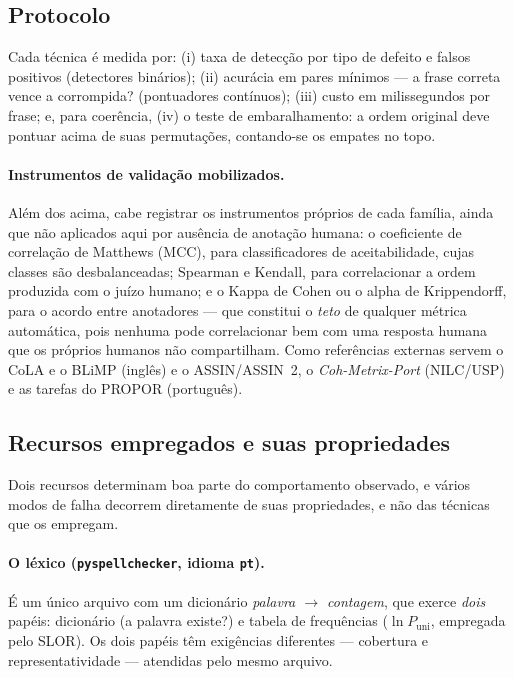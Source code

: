 \documentclass[11pt,a4paper]{article}
\begin{document}
\subsection{Protocolo}

Cada técnica é medida por: (i) taxa de detecção por tipo de defeito e falsos positivos (detectores
binários); (ii) acurácia em pares mínimos --- a frase correta vence a corrompida? (pontuadores
contínuos); (iii) custo em milissegundos por frase; e, para coerência, (iv) o teste de
embaralhamento: a ordem original deve pontuar acima de suas permutações, contando-se os empates no
topo.

\paragraph{Instrumentos de validação mobilizados.} Além dos acima, cabe registrar os instrumentos
próprios de cada família, ainda que não aplicados aqui por ausência de anotação humana: o
coeficiente de correlação de Matthews (MCC), para classificadores de aceitabilidade, cujas classes
são desbalanceadas; Spearman e Kendall, para correlacionar a ordem produzida com o juízo humano; e o
Kappa de Cohen ou o alpha de Krippendorff, para o acordo entre anotadores --- que constitui o
\emph{teto} de qualquer métrica automática, pois nenhuma pode correlacionar bem com uma resposta
humana que os próprios humanos não compartilham. Como referências externas servem o CoLA e o BLiMP
(inglês) e o ASSIN/ASSIN~2, o \textit{Coh-Metrix-Port} (NILC/USP) e as tarefas do PROPOR
(português).

\subsection{Recursos empregados e suas propriedades}
\label{sec:recursos}

Dois recursos determinam boa parte do comportamento observado, e vários modos de falha decorrem
diretamente de suas propriedades, e não das técnicas que os empregam.

\paragraph{O léxico (\texttt{pyspellchecker}, idioma \texttt{pt}).} É um único arquivo com um
dicionário \emph{palavra $\rightarrow$ contagem}, que exerce \emph{dois} papéis: dicionário (a
palavra existe?) e tabela de frequências ($\ln P_{\mathrm{uni}}$, empregada pelo SLOR). Os dois
papéis têm exigências diferentes --- cobertura e representatividade --- atendidas pelo mesmo
arquivo.
\end{document}
